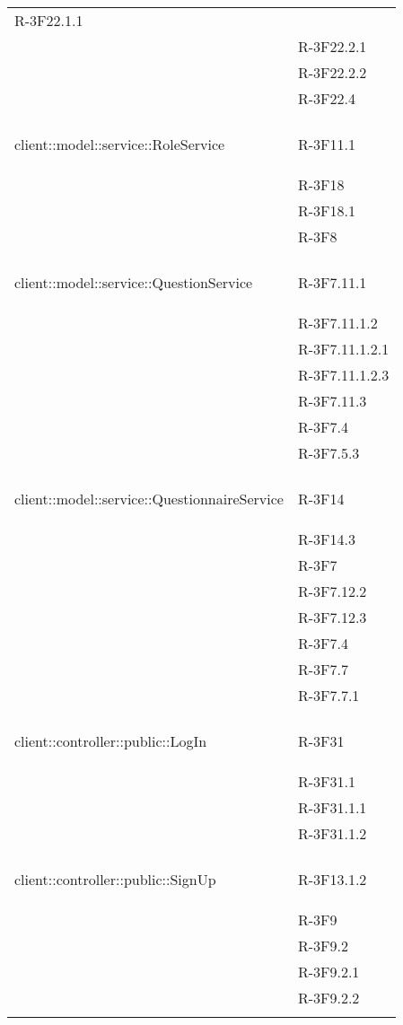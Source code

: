 \begin{longtable}{l p{3cm}}
	R-3F22.1.1 \tabularnewline &
	
	R-3F22.2.1 \tabularnewline &
	
	R-3F22.2.2 \tabularnewline &
	
	R-3F22.4 \tabularnewline &\tabularnewline
	\hline
	\hypertarget{client::model::service::RoleService}{client::model::service::RoleService} & R-3F11.1 \tabularnewline &
	
	R-3F18 \tabularnewline &
	
	R-3F18.1 \tabularnewline &
	
	R-3F8 \tabularnewline &\tabularnewline
	\hline
	\hypertarget{client::model::service::QuestionService}{client::model::service::QuestionService} & R-3F7.11.1 \tabularnewline &
	
	R-3F7.11.1.2 \tabularnewline &
	
	R-3F7.11.1.2.1 \tabularnewline &
	
	R-3F7.11.1.2.3 \tabularnewline &
	
	R-3F7.11.3 \tabularnewline &
	
	R-3F7.4 \tabularnewline &
	
	R-3F7.5.3 \tabularnewline &\tabularnewline
	\hline
	\hypertarget{client::model::service::QuestionnaireService}{client::model::service::QuestionnaireService} & R-3F14 \tabularnewline &
	
	R-3F14.3 \tabularnewline &
	
	R-3F7 \tabularnewline &
	
	R-3F7.12.2 \tabularnewline &
	
	R-3F7.12.3 \tabularnewline &
	
	R-3F7.4 \tabularnewline &
	
	R-3F7.7 \tabularnewline &
	
	R-3F7.7.1 \tabularnewline &\tabularnewline
	\hline
	\hypertarget{client::controller::public::LogIn}{client::controller::public::LogIn} & R-3F31 \tabularnewline &
	
	R-3F31.1 \tabularnewline &
	
	R-3F31.1.1 \tabularnewline &
	
	R-3F31.1.2 \tabularnewline &\tabularnewline
	\hline
	\hypertarget{client::controller::public::SignUp}{client::controller::public::SignUp} & R-3F13.1.2 \tabularnewline &
	
	R-3F9 \tabularnewline &
	
	R-3F9.2 \tabularnewline &
	
	R-3F9.2.1 \tabularnewline &
	
	R-3F9.2.2 \tabularnewline &
	

\end{longtable}
